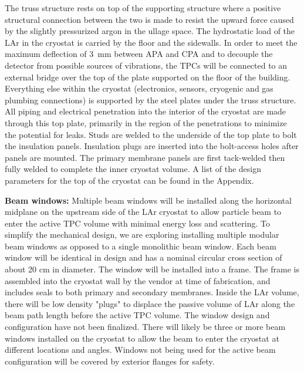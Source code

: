 The truss structure rests on top of the supporting structure where a positive structural connection 
between the two is made to resist the upward force caused by the slightly pressurized argon in the ullage 
space. The hydrostatic load of the LAr in the cryostat is carried by the floor and the sidewalls. In order to meet the maximum deflection of 3~mm between APA and CPA 
and to decouple the detector from possible sources of vibrations, the TPCs will be connected to an external bridge over the top of the plate supported on the floor of the building. Everything else within the cryostat %
(electronics, sensors, cryogenic and gas plumbing connections) is 
supported by the steel plates under the truss structure. All piping and electrical penetration into the 
interior of the cryostat are made through this top plate, primarily in the region of the penetrations to 
minimize the potential for leaks. Studs are welded to the underside of the top plate to bolt the insulation 
panels. Insulation plugs are inserted into the bolt-access holes after panels are mounted. The primary 
membrane panels are first tack-welded then fully welded to complete the inner cryostat volume.
%
A list of the design parameters for the top of the cryostat can be found in the Appendix.

\textbf{Beam windows:}
Multiple beam windows will be installed along the horizontal midplane
on the upstream side of the LAr cryostat to allow particle beam to
enter the active TPC volume with minimal energy loss and scattering.
To simplify the mechanical design, we are exploring installing
multiple modular beam windows as opposed to a single monolithic beam
window. Each beam window will be identical in design and has a nominal
circular cross section of about 20 cm in diameter. The window will be
installed into a frame. The frame is assembled into the cryostat wall
by the vendor at time of fabrication, and includes seals to both
primary and secondary membranes. Inside the LAr volume, there will be low
density "plugs" to displace the passive volume of LAr along the beam
path length before the active TPC volume. The window design and
configuration have not been finalized. There will likely be three or
more beam windows installed on the cryostat to allow the beam to enter
the cryostat at different locations and angles. Windows not being used
for the active beam configuration will be covered by exterior flanges
for safety.

